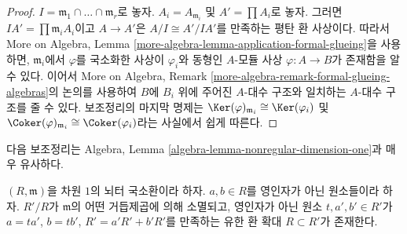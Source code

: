 \begin{proof}
$I = \mathfrak m_1 \cap \ldots \cap \mathfrak m_r$로 놓자.
$A_i = A_{\mathfrak m_i}$ 및 $A' = \prod A_i$로 놓자. 그러면
$IA' = \prod \mathfrak m_i A_i$이고 $A \to A'$은
$A/I \cong A'/IA'$를 만족하는 평탄 환 사상이다. 따라서 More on
Algebra, Lemma \ref{more-algebra-lemma-application-formal-glueing}을
사용하면, $\mathfrak m_i$에서 $\varphi$를 국소화한 사상이
$\varphi_i$와 동형인 $A$-모듈 사상 $\varphi : A \to B$가 존재함을
알 수 있다. 이어서 More on Algebra, Remark
\ref{more-algebra-remark-formal-glueing-algebras}의 논의를 사용하여
$B$에 $B_i$ 위에 주어진 $A$-대수 구조와 일치하는 $A$-대수 구조를
줄 수 있다. 보조정리의 마지막 명제는
$\Ker(\varphi)_{\mathfrak m_i} \cong \Ker(\varphi_i)$ 및
$\Coker(\varphi)_{\mathfrak m_i} \cong \Coker(\varphi_i)$라는 사실에서
쉽게 따른다.
\end{proof}
\noindent
다음 보조정리는 Algebra, Lemma
\ref{algebra-lemma-nonregular-dimension-one}과 매우 유사하다.

\begin{lemma}
\label{lemma-Noetherian-domain-dim-1-two-elements}
$(R, \mathfrak m)$을 차원 $1$의 뇌터 국소환이라 하자. $a, b \in R$를
영인자가 아닌 원소들이라 하자. $R'/R$가 $\mathfrak m$의 어떤
거듭제곱에 의해 소멸되고, 영인자가 아닌 원소 $t, a', b' \in R'$가
$a = ta'$, $b = tb'$, $R' = a'R' + b'R'$를 만족하는 유한 환 확대
$R \subset R'$가 존재한다.
\end{lemma}

